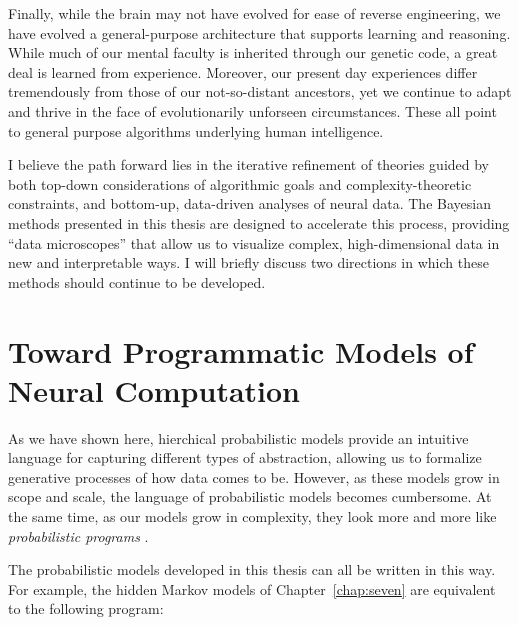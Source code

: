 Finally, while the brain may not have evolved for ease of reverse
engineering, we have evolved a general-purpose architecture that
supports learning and reasoning.  While much of our mental faculty is
inherited through our genetic code, a great deal is learned from
experience. Moreover, our present day experiences differ tremendously
from those of our not-so-distant ancestors, yet we continue to adapt
and thrive in the face of evolutionarily unforseen
circumstances. These all point to general purpose algorithms
underlying human intelligence.

I believe the path forward lies in the iterative refinement of
theories guided by both top-down considerations of algorithmic goals
and complexity-theoretic constraints, and bottom-up, data-driven
analyses of neural data. The Bayesian methods presented in this thesis
are designed to accelerate this process, providing ``data
microscopes'' that allow us to visualize complex, high-dimensional
data in new and interpretable ways. I will briefly discuss two
directions in which these methods should continue to be developed.

\section{Toward Programmatic Models of Neural Computation}
As we have
shown here, hierchical probabilistic models provide an intuitive
language for capturing different types of abstraction, allowing us to
formalize generative processes of how data comes to be. However, as
these models grow in scope and scale, the language of probabilistic
models becomes cumbersome. At the same time, as our models grow in
complexity, they look more and more like \emph{probabilistic
  programs} \citep{goodman2008church}.

The probabilistic models developed in this thesis can all be written in
this way. For example, the hidden Markov models of
Chapter~\ref{chap:seven} are equivalent to the following program:

